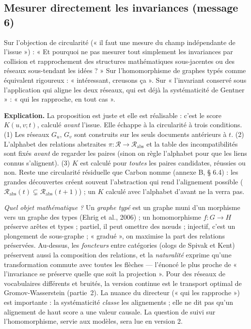 \documentclass[a4paper,11pt]{article}
\begin{document}
\subsection{Mesurer directement les invariances (message 6)}\label{sec:mesure-directe}
\begin{enonce}
Sur l'objection de circularité (« il faut une mesure du champ indépendante de l'issue ») : « Et pourquoi ne pas mesurer tout simplement les invariances par collision et rapprochement des structures mathématiques sous-jacentes ou des réseaux sous-tendant les idées ? » Sur l'homomorphisme de graphes typés comme équivalent rigoureux : « intéressant, creusons ça ». Sur « l'invariant conservé sous l'application qui aligne les deux réseaux, qui est déjà la systématicité de Gentner » : « qui les rapproche, en tout cas ».
\end{enonce}

\textbf{Explication.} La proposition est juste et elle est réalisable : c'est le score $K(u,v;t)$, calculé \emph{avant} l'issue. Elle échappe à la circularité à trois conditions. (1) Les réseaux $G_u$, $G_v$ sont construits sur les seuls documents antérieurs à $t$. (2) L'alphabet des relations abstraites $\pi:\mathcal R\to\mathcal R_{\text{abs}}$ et la table des incompatibilités sont fixés \emph{avant} de regarder les paires (sinon on règle l'alphabet pour que les liens connus s'alignent). (3) $K$ est calculé pour \emph{toutes} les paires candidates, réussies ou non. Reste une circularité résiduelle que Carbon nomme (annexe B, § 6.4) : les grandes découvertes créent souvent l'abstraction qui rend l'alignement possible ($\mathcal R_{\text{abs}}(t)\subsetneq\mathcal R_{\text{abs}}(t+1)$) ; un $K$ calculé avec l'alphabet d'avant ne la verra pas.

\emph{Quel objet mathématique ?} Un \emph{graphe typé} est un graphe muni d'un morphisme vers un graphe des types (Ehrig et al., 2006) ; un homomorphisme $f:G\to H$ préserve arêtes et types ; partiel, il peut omettre des nœuds ; injectif, c'est un plongement de sous-graphe ; « gradué », on maximise la part des relations préservées. Au-dessus, les \emph{foncteurs} entre catégories (ologs de Spivak et Kent) préservent aussi la composition des relations, et la \emph{naturalité} exprime qu'une transformation commute avec toutes les flèches — l'énoncé le plus proche de « l'invariance se préserve quelle que soit la projection ». Pour des réseaux de vocabulaires différents et bruités, la version continue est le transport optimal de Gromov-Wasserstein (partie~2). La nuance du directeur (« qui les rapproche ») est importante : la systématicité \emph{classe} les alignements ; elle ne dit pas qu'un alignement de haut score a une valeur causale. La question de suivi sur l'homomorphisme, servie aux modèles, sera lue en version 2.
\end{document}

